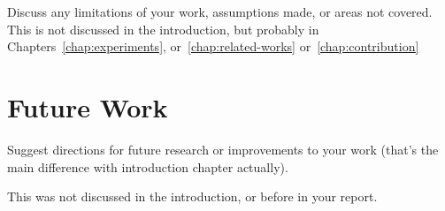 \documentclass[12pt, a4paper]{report}
\begin{document}
Discuss any limitations of your work, assumptions made, or areas not covered.
This is not discussed in the introduction, but probably in Chapters~\ref{chap:experiments}, or~\ref{chap:related-works} or~\ref{chap:contribution}

\lipsum[1-2]

\section{Future Work}
\label{sec:future-work}

Suggest directions for future research or improvements to your work (that's the main difference with introduction chapter actually).

This was not discussed in the introduction, or before in your report.

\lipsum[1]

\clearpage

\printbibliography[title=References]
\end{document}
